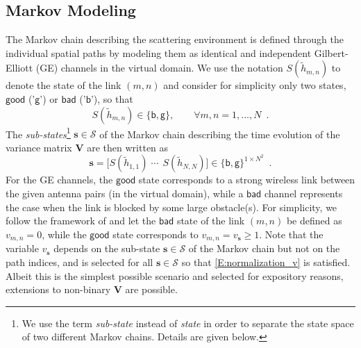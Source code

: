 \documentclass[10pt,conference]{IEEEtran}
\begin{document}
\subsection{Markov Modeling}
    \label{Sec:MarkovModleingCorMIMO}

The Markov chain describing the scattering environment is defined through the individual spatial paths by modeling them as identical and independent Gilbert-Elliott (GE) channels in the virtual domain.
We use the notation $S(\widetilde{h}_{m,n})$ to denote the state of the link $(m,n)$ and consider
for simplicity only two states, $\mathsf{good}$ ('$\mathsf{g}$') or $\mathsf{bad}$ ('$\mathsf{b}$'), so that
\begin{equation}\label{E:state_of_link_mn}
	S(\widetilde{h}_{m,n})\in\{\mathsf{b},\mathsf{g}\},\qquad \forall m,n = 1,\ldots,N \enspace.
\end{equation}
The \emph{sub-states}\footnote{We use the term \emph{sub-state} instead of \emph{state} in order to separate the state space of two different Markov chains.  Details are given below.}
$\mathbf{s}\in\mathcal{S}$ of the Markov chain describing the time evolution of the variance matrix $\mathbf{V}$ are then written as
\begin{equation}
	\mathbf{s} = \big[S(\widetilde{h}_{1,1}) \; \cdots \;\, S(\widetilde{h}_{N,N})\big] \in \{\mathsf{b},\mathsf{g} \}^{1\times N^{2}} \enspace.
\end{equation}
For the GE channels, the $\mathsf{good}$ state corresponds to a strong wireless link between the given antenna pairs (in the virtual domain), while a $\mathsf{bad}$ channel represents the case when the link is blocked by some large obstacle(s).
For simplicity, we follow the framework of \cite{Raghavan:2010:WKM} and let the $\mathsf{bad}$ state of the link $(m,n)$ be defined as $v_{m,n}=0$, while the $\mathsf{good}$ state corresponds to $v_{m,n}=v_{\mathbf{s}} \geq 1$.  Note that the variable $v_{\mathbf{s}}$ depends on the sub-state
$\mathbf{s}\in\mathcal{S}$ of the Markov chain
but not on the path indices, and is selected for all $\mathbf{s}\in\mathcal{S}$ so that \eqref{E:normalization_v} is satisfied.  Albeit this is the simplest possible scenario and selected for expository reasons, extensions to non-binary $\mathbf{V}$ are possible.
\end{document}
